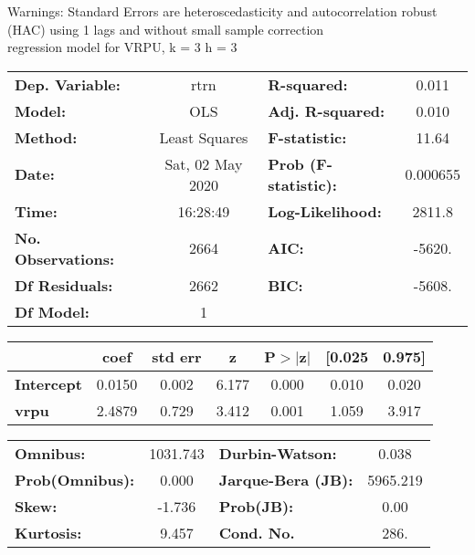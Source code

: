 Warnings: \newline
 [1] Standard Errors are heteroscedasticity and autocorrelation robust (HAC) using 1 lags and without small sample correction\\ 

regression model for VRPU, k = 3 h = 3\begin{center}
\begin{tabular}{lclc}
\toprule
\textbf{Dep. Variable:}    &       rtrn       & \textbf{  R-squared:         } &     0.011   \\
\textbf{Model:}            &       OLS        & \textbf{  Adj. R-squared:    } &     0.010   \\
\textbf{Method:}           &  Least Squares   & \textbf{  F-statistic:       } &     11.64   \\
\textbf{Date:}             & Sat, 02 May 2020 & \textbf{  Prob (F-statistic):} &  0.000655   \\
\textbf{Time:}             &     16:28:49     & \textbf{  Log-Likelihood:    } &    2811.8   \\
\textbf{No. Observations:} &        2664      & \textbf{  AIC:               } &    -5620.   \\
\textbf{Df Residuals:}     &        2662      & \textbf{  BIC:               } &    -5608.   \\
\textbf{Df Model:}         &           1      & \textbf{                     } &             \\
\bottomrule
\end{tabular}
\begin{tabular}{lcccccc}
                   & \textbf{coef} & \textbf{std err} & \textbf{z} & \textbf{P$> |$z$|$} & \textbf{[0.025} & \textbf{0.975]}  \\
\midrule
\textbf{Intercept} &       0.0150  &        0.002     &     6.177  &         0.000        &        0.010    &        0.020     \\
\textbf{vrpu}      &       2.4879  &        0.729     &     3.412  &         0.001        &        1.059    &        3.917     \\
\bottomrule
\end{tabular}
\begin{tabular}{lclc}
\textbf{Omnibus:}       & 1031.743 & \textbf{  Durbin-Watson:     } &    0.038  \\
\textbf{Prob(Omnibus):} &   0.000  & \textbf{  Jarque-Bera (JB):  } & 5965.219  \\
\textbf{Skew:}          &  -1.736  & \textbf{  Prob(JB):          } &     0.00  \\
\textbf{Kurtosis:}      &   9.457  & \textbf{  Cond. No.          } &     286.  \\
\bottomrule
\end{tabular}
\end{center}

